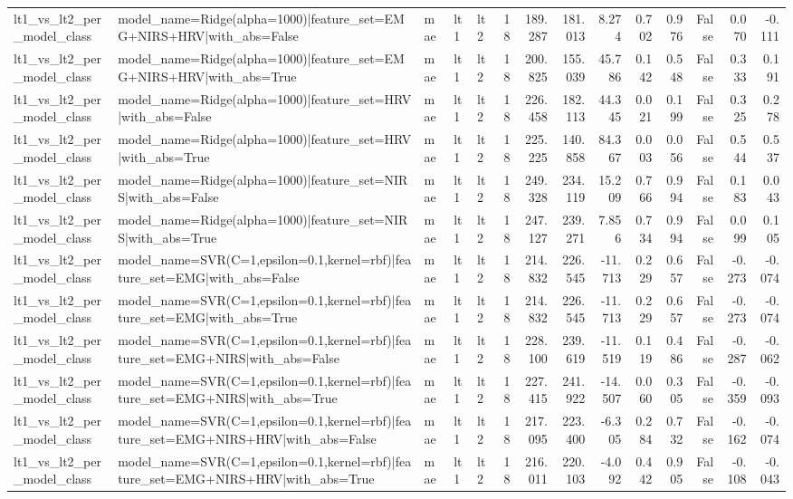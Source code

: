 \begin{table}
\begin{tabular}{lllllrrrrrrrrr}
lt1_vs_lt2_per_model_class & model_name=Ridge(alpha=1000)|feature_set=EMG+NIRS+HRV|with_abs=False & mae & lt1 & lt2 & 18 & 189.287 & 181.013 & 8.274 & 0.702 & 0.976 & False & 0.070 & -0.111 \\
lt1_vs_lt2_per_model_class & model_name=Ridge(alpha=1000)|feature_set=EMG+NIRS+HRV|with_abs=True & mae & lt1 & lt2 & 18 & 200.825 & 155.039 & 45.786 & 0.142 & 0.548 & False & 0.333 & 0.191 \\
lt1_vs_lt2_per_model_class & model_name=Ridge(alpha=1000)|feature_set=HRV|with_abs=False & mae & lt1 & lt2 & 18 & 226.458 & 182.113 & 44.345 & 0.021 & 0.199 & False & 0.325 & 0.278 \\
lt1_vs_lt2_per_model_class & model_name=Ridge(alpha=1000)|feature_set=HRV|with_abs=True & mae & lt1 & lt2 & 18 & 225.225 & 140.858 & 84.367 & 0.003 & 0.056 & False & 0.544 & 0.537 \\
lt1_vs_lt2_per_model_class & model_name=Ridge(alpha=1000)|feature_set=NIRS|with_abs=False & mae & lt1 & lt2 & 18 & 249.328 & 234.119 & 15.209 & 0.766 & 0.994 & False & 0.183 & 0.043 \\
lt1_vs_lt2_per_model_class & model_name=Ridge(alpha=1000)|feature_set=NIRS|with_abs=True & mae & lt1 & lt2 & 18 & 247.127 & 239.271 & 7.856 & 0.734 & 0.994 & False & 0.099 & 0.105 \\
lt1_vs_lt2_per_model_class & model_name=SVR(C=1,epsilon=0.1,kernel=rbf)|feature_set=EMG|with_abs=False & mae & lt1 & lt2 & 18 & 214.832 & 226.545 & -11.713 & 0.229 & 0.657 & False & -0.273 & -0.074 \\
lt1_vs_lt2_per_model_class & model_name=SVR(C=1,epsilon=0.1,kernel=rbf)|feature_set=EMG|with_abs=True & mae & lt1 & lt2 & 18 & 214.832 & 226.545 & -11.713 & 0.229 & 0.657 & False & -0.273 & -0.074 \\
lt1_vs_lt2_per_model_class & model_name=SVR(C=1,epsilon=0.1,kernel=rbf)|feature_set=EMG+NIRS|with_abs=False & mae & lt1 & lt2 & 18 & 228.100 & 239.619 & -11.519 & 0.119 & 0.486 & False & -0.287 & -0.062 \\
lt1_vs_lt2_per_model_class & model_name=SVR(C=1,epsilon=0.1,kernel=rbf)|feature_set=EMG+NIRS|with_abs=True & mae & lt1 & lt2 & 18 & 227.415 & 241.922 & -14.507 & 0.060 & 0.305 & False & -0.359 & -0.093 \\
lt1_vs_lt2_per_model_class & model_name=SVR(C=1,epsilon=0.1,kernel=rbf)|feature_set=EMG+NIRS+HRV|with_abs=False & mae & lt1 & lt2 & 18 & 217.095 & 223.400 & -6.305 & 0.284 & 0.732 & False & -0.162 & -0.074 \\
lt1_vs_lt2_per_model_class & model_name=SVR(C=1,epsilon=0.1,kernel=rbf)|feature_set=EMG+NIRS+HRV|with_abs=True & mae & lt1 & lt2 & 18 & 216.011 & 220.103 & -4.092 & 0.442 & 0.905 & False & -0.108 & -0.043 \\

\end{tabular}
\end{table}
